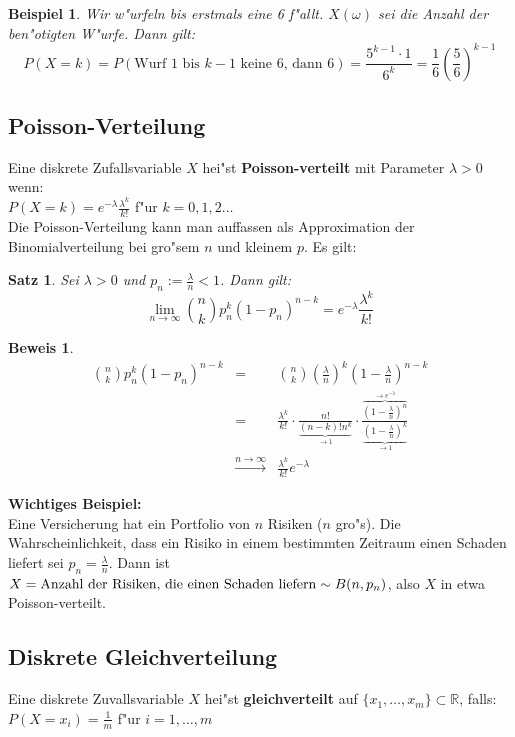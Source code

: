 \documentclass[a4paper,11pt]{book}
\newcommand{\R}{{\mathbb R}}
\newtheorem{Sa}{Satz}[chapter]
\newtheorem{Bsp}{Beispiel}[chapter]
\theoremstyle{nonumberplain}
\newtheorem{Bew}{Beweis}
\begin{document}
\begin{Bsp}
Wir w"urfeln bis erstmals eine 6 f"allt. $X(\omega)$ sei die Anzahl der ben"otigten W"urfe. Dann gilt:
\[P(X=k)=P(\text{Wurf $1$ bis $k-1$ keine $6$, dann 6})=\frac{5^{k-1}\cdot 1}{6^k}=\frac{1}{6}(\frac{5}{6})^{k-1}\]
\end{Bsp}

\subsection{Poisson-Verteilung}
Eine diskrete Zufallsvariable $X$ hei"st \textbf{Poisson-verteilt} mit Parameter $\lambda >0$ wenn:\\
$P(X=k)=e^{-\lambda}\frac{\lambda^k}{k!}$ f"ur $k=0,1,2\ldots$\\
Die Poisson-Verteilung kann man auffassen als Approximation der Binomialverteilung bei gro"sem $n$ und kleinem $p$. Es gilt:

\begin{Sa}
Sei $\lambda>0$ und $p_n:=\frac{\lambda}{n}<1$. Dann gilt:
\[ \lim_{n\to\infty}\binom{n}{k}p_n^k(1-p_n)^{n-k}=e^{-\lambda}\frac{\lambda^k}{k!}\]
\end{Sa}

\begin{Bew}
\begin{eqnarray*}
\binom{n}{k}p_n^k(1-p_n)^{n-k} & = & \binom{n}{k}\left(\frac{\lambda}{n}\right)^k\left(1-\frac{\lambda}{n}\right)^{n-k} \\
 & =&  \frac{\lambda^k}{k!}\cdot\frac{n!}{\underbrace{(n-k)!n^k}_{\to 1}}\cdot \frac{\overbrace{(1-\frac{\lambda}{n})^n}^{\to e^{-\lambda}}}{\underbrace{(1-\frac{\lambda}{n})^k}_{\to 1}} \\
  & \xrightarrow{n\to\infty} & \frac{\lambda^k}{k!}e^{-\lambda} 
\end{eqnarray*}
\end{Bew}
\textbf{Wichtiges Beispiel:}\\
Eine Versicherung hat ein Portfolio von $n$ Risiken ($n$ gro"s). Die Wahrscheinlichkeit, dass ein Risiko in einem bestimmten Zeitraum einen Schaden liefert sei $p_n=\frac{\lambda}{n}$. Dann ist $X=\textnormal{Anzahl der Risiken, die einen Schaden liefern}\sim B(n,p_n)$, also $X$ in etwa Poisson-verteilt.

\subsection{Diskrete Gleichverteilung}
Eine diskrete Zuvallsvariable $X$ hei"st \textbf{gleichverteilt} auf $\{x_1,\ldots,x_m\}\subset \R$, falls:\\
$P(X=x_i)=\frac{1}{m}$ f"ur $i=1,\ldots,m$
\end{document}
